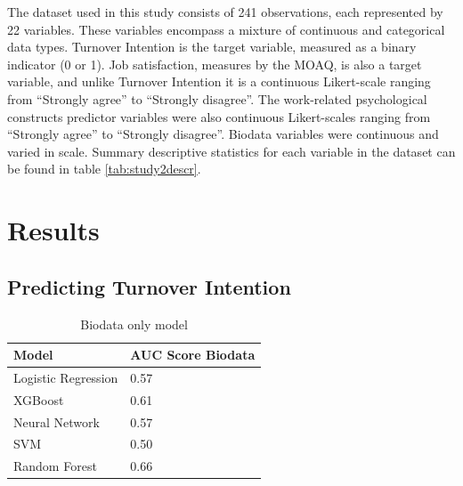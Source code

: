 \documentclass[
  man]{apa7}
\begin{document}
The dataset used in this study consists of 241 observations, each represented by 22 variables. These variables encompass a mixture of continuous and categorical data types. Turnover Intention is the target variable, measured as a binary indicator (0 or 1). Job satisfaction, measures by the MOAQ, is also a target variable, and unlike Turnover Intention it is a continuous Likert-scale ranging from ``Strongly agree'' to ``Strongly disagree''. The work-related psychological constructs predictor variables were also continuous Likert-scales ranging from ``Strongly agree'' to ``Strongly disagree''. Biodata variables were continuous and varied in scale. Summary descriptive statistics for each variable in the dataset can be found in table \ref{tab:study2descr}.

\section{Results}\label{results-1}

\subsection{Predicting Turnover Intention}\label{predicting-turnover-intention}

\begin{table}[tbp]

\begin{center}
\begin{threeparttable}

\caption{\label{tab:biotable}Biodata only model}

\begin{tabular}{ll}
\toprule
Model & \multicolumn{1}{c}{AUC Score Biodata}\\
\midrule
Logistic Regression & 0.57\\
XGBoost & 0.61\\
Neural Network & 0.57\\
SVM & 0.50\\
Random Forest & 0.66\\
\bottomrule
\end{tabular}

\end{threeparttable}
\end{center}

\end{table}
\end{document}

